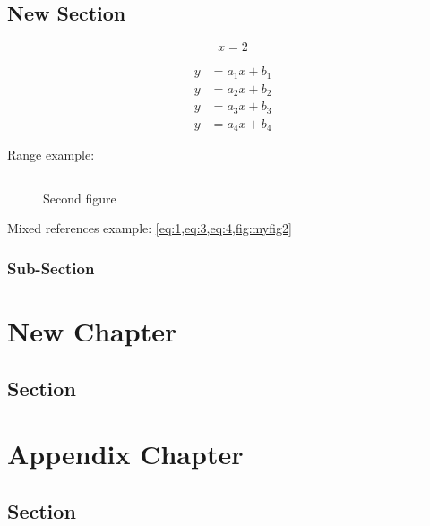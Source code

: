\documentclass[12pt]{book}
\begin{document}
\section{New Section}

\begin{equation}
x = 2
\end{equation}

\blindtext
\blindtext
\begin{align}
  y&=a_1x+b_1\label{eq:1}\\
  y&=a_2x+b_2\label{eq:2}\\
  y&=a_3x+b_3\label{eq:3}\\
  y&=a_4x+b_4\label{eq:4}
\end{align}

\noindent
Range example: 
 
\begin{figure}[ht]
  \centering
  \rule{0.5\linewidth}{0.1\linewidth}
  \caption{Second figure}
  \label{fig:myfig2}
\end{figure}
 
\noindent
Mixed references example: \cref{eq:1,eq:3,eq:4,fig:myfig2}
 

\subsection{Sub-Section}

\Blindtext

\chapter{New Chapter}

\blindtext

\section{Section}

\Blindtext


\appendix

\chapter{Appendix Chapter}

\blindtext

\section{Section}

\Blindtext
\end{document}
